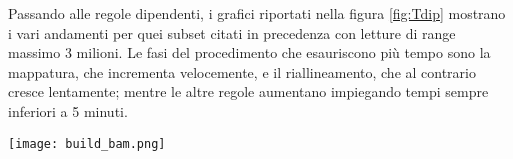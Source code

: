 Passando alle regole dipendenti, i grafici riportati nella figura \ref{fig:Tdip} mostrano i vari andamenti per quei subset citati in precedenza con letture di range massimo 3 milioni.
Le fasi del procedimento che esauriscono più tempo sono la mappatura, che incrementa velocemente, e il riallineamento, che al contrario cresce lentamente; mentre le altre regole aumentano impiegando tempi sempre inferiori a 5 minuti.
\begin{table}[H]
  \begin{minipage}[b]{0.4\linewidth}
	\centering
	\texttt{[image: build\_bam.png]}
	\label{subfig:BB}
  \end{minipage}
  \hfill 
  \begin{varwidth}[b]{0.4\linewidth}
    \centering
    \caption{Dettagli retta di fit per Build BAM.}
    \label{tab:Bb}
  \end{varwidth}%
\end{table}

